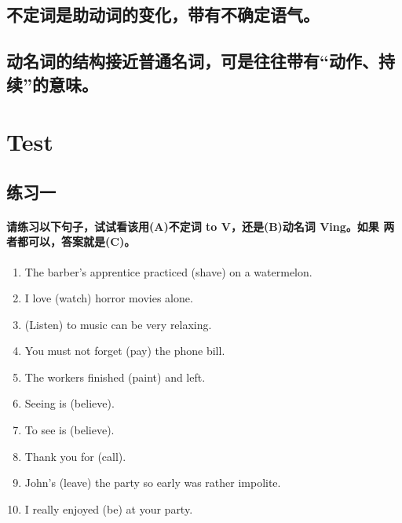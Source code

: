 \subsection{不定词是助动词的变化，带有不确定语气。}
\subsection{动名词的结构接近普通名词，可是往往带有“动作、持续”的意味。}

\section{Test}

\subsection{练习一}

\paragraph{请练习以下句子，试试看该用(A)不定词 to V，还是(B)动名词 Ving。如果
  两者都可以，答案就是(C)。}

\begin{enumerate}
\item The barber's apprentice practiced \ttu (shave) on a watermelon.

\item I love \ttu (watch) horror movies alone.

\item \ttu (Listen) to music can be very relaxing.

\item You must not forget \ttu (pay) the phone bill.

\item The workers finished \ttu (paint) and left.

\item Seeing is \ttu (believe).

\item To see is \ttu (believe).

\item Thank you for \ttu (call).

\item John's \ttu (leave) the party so early was rather impolite.

\item I really enjoyed \ttu (be) at your party.
\end{enumerate}


